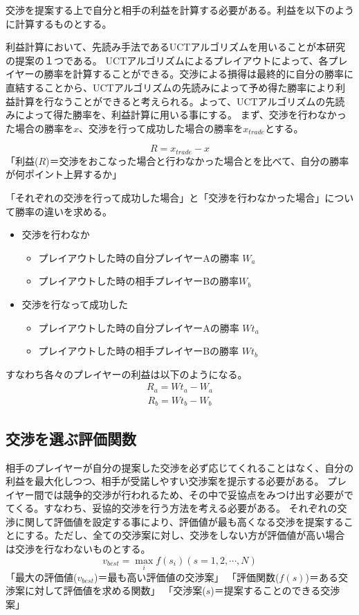 \documentclass[a4, 10pt,dvipdfmx]{jsarticle}
\begin{document}
交渉を提案する上で自分と相手の利益を計算する必要がある。利益を以下のように計算するものとする。

利益計算において、先読み手法であるUCTアルゴリズムを用いることが本研究の提案の１つである。
UCTアルゴリズムによるプレイアウトによって、各プレイヤーの勝率を計算することができる。交渉による損得は最終的に自分の勝率に直結することから、UCTアルゴリズムの先読みによって予め得た勝率により利益計算を行なうことができると考えられる。よって、UCTアルゴリズムの先読みによって得た勝率を、利益計算に用いる事にする。  
まず、交渉を行わなかった場合の勝率を$x$、交渉を行って成功した場合の勝率を$x_{trade}$とする。

\begin{equation}
  R = x_{trade} - x
\end{equation}
「利益($R$)＝交渉をおこなった場合と行わなかった場合とを比べて、自分の勝率が何ポイント上昇するか」

「それぞれの交渉を行って成功した場合」と「交渉を行わなかった場合」について勝率の違いを求める。
\begin{itemize}
 \item 交渉を行わなか
    \begin{itemize}
      \item プレイアウトした時の自分プレイヤーAの勝率 $W_a$
      \item プレイアウトした時の相手プレイヤーBの勝率$W_b$
     \end{itemize}
 \item 交渉を行なって成功した
    \begin{itemize}
      \item プレイアウトした時の自分プレイヤーAの勝率 $Wt_a$
      \item プレイアウトした時の相手プレイヤーBの勝率 $Wt_b$
     \end{itemize}
\end{itemize}
すなわち各々のプレイヤーの利益は以下のようになる。
\begin{eqnarray}
  R_{a}=Wt_a - W_a
\end{eqnarray}
\begin{eqnarray}
  R_{b}=Wt_b - W_b
\end{eqnarray}


\subsection{交渉を選ぶ評価関数}
相手のプレイヤーが自分の提案した交渉を必ず応じてくれることはなく、自分の利益を最大化しつつ、相手が受諾しやすい交渉案を提示する必要がある。
プレイヤー間では競争的交渉が行われるため、その中で妥協点をみつけ出す必要がでてくる。すなわち、妥協的交渉を行う方法を考える必要がある。
それぞれの交渉に関して評価値を設定する事により、評価値が最も高くなる交渉を提案することにする。ただし、全ての交渉案に対し、交渉をしない方が評価値が高い場合は交渉を行なわないものとする。  
\begin{equation}
  v_{best} =  \max_{i}f(s_{i}) ( s = 1, 2, \cdots, N )
\end{equation}
「最大の評価値($v_{best}$)＝最も高い評価値の交渉案」
「評価関数($f(s)$)＝ある交渉案に対して評価値を求める関数」
「交渉案($s$)＝提案することのできる交渉案」
\end{document}
